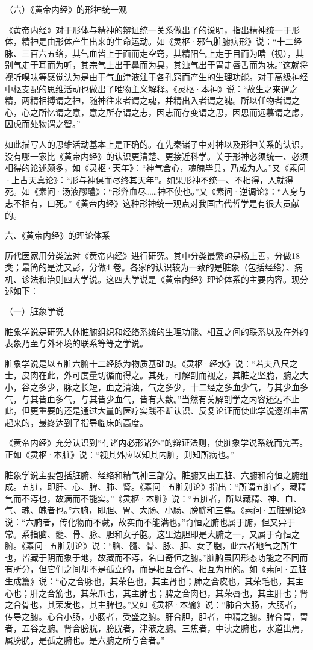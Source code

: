 \documentclass[12pt,UTF8]{ctexbook}
\begin{document}
（六）《黄帝内经》的形神统一观

《黄帝内经》对于形体与精神的辩证统一关系做出了的说明，指出精神统一于形体，精神是由形体产生出来的生命运动。如《灵枢·邪气脏腑病形》说：“十二经脉、三百六五络，其气血皆上于面而走空窍，其精阳气上走于目而为睛（视），其别气走于耳而为听，其宗气上出于鼻而为臭，其浊气出于胃走唇舌而为味。”这就将视听嗅味等感觉认为是由于气血津液注于各孔窍而产生的生理功能。对于高级神经中枢支配的思维活动也做出了唯物主义解释。《灵枢·本神》说：“故生之来谓之精，两精相搏谓之神，随神往来者谓之魂，并精出入者谓之魄。所以任物者谓之心，心之所忆谓之意，意之所存谓之志，因志而存变谓之思，因思而远慕谓之虑，因虑而处物谓之智。”

如此描写人的思维活动基本上是正确的。在先秦诸子中对神以及形神关系的认识，没有哪一家比《黄帝内经》的认识更清楚、更接近科学。关于形神必须统一、必须相得的论述颇多，如《灵枢·天年》：“神气舍心，魂魄毕具，乃成为人。”又《素问·上古天真论》：“形与神俱而尽终其天年”。如果形神不统一、不相得，人就得死。如《素问·汤液醪醴》：“形弊血尽……神不使也。”又《素问·逆调论》：“人身与志不相有，曰死。”《黄帝内经》这种形神统一观点对我国古代哲学是有很大贡献的。

六、《黄帝内经》的理论体系

历代医家用分类法对《黄帝内经》进行研究。其中分类最繁的是杨上善，分做18 类；最简的是沈又彭，分做4 卷。各家的认识较为一致的是脏象（包括经络）、病机、诊法和治则四大学说。这四大学说是《黄帝内经》理论体系的主要内容。现分述如下：

（一）脏象学说

脏象学说是研究人体脏腑组织和经络系统的生理功能、相互之间的联系以及在外的表象乃至与外环境的联系等等之学说。

脏象学说是以五脏六腑十二经脉为物质基础的。《灵枢·经水》说：“若夫八尺之士，皮肉在此，外可度量切循而得之。其死，可解剖而视之，其脏之坚脆，腑之大小，谷之多少，脉之长短，血之清浊，气之多少，十二经之多血少气，与其少血多气，与其皆血多气，与其皆少血气，皆有大数。”当然有关解剖学之内容还远不止此，但更重要的还是通过大量的医疗实践不断认识、反复论证而使此学说逐渐丰富起来的，最终达到了指导临床的高度。

《黄帝内经》充分认识到“有诸内必形诸外”的辩证法则，使脏象学说系统而完善。正如《灵枢·本脏》说：“视其外应以知其内脏，则知所病也。”

脏象学说主要包括脏腑、经络和精气神三部分。脏腑又由五脏、六腑和奇恒之腑组成。五脏，即肝、心、脾、肺、肾。《素问·五脏别论》指出：“所谓五脏者，藏精气而不泻也，故满而不能实。”《灵枢·本脏》说：“五脏者，所以藏精、神、血、气、魂、魄者也。”六腑，即胆、胃、大肠、小肠、膀胱和三焦。《素问·五脏别论》说：“六腑者，传化物而不藏，故实而不能满也。”奇恒之腑也属于腑，但又异于常。系指脑、髓、骨、脉、胆和女子胞。这里边胆即是大腑之一，又属于奇恒之腑。《素问·五脏别论》说：“脑、髓、骨、脉、胆、女子胞，此六者地气之所生也，皆藏于阴而象于地，故藏而不泻，名曰奇恒之腑。”脏腑虽因形态功能之不同而有所分，但它们之间却不是孤立的，而是相互合作、相互为用的。如《素问·五脏生成篇》说：“心之合脉也，其荣色也，其主肾也；肺之合皮也，其荣毛也，其主心也；肝之合筋也，其荣爪也，其主肺也；脾之合肉也，其荣唇也，其主肝也；肾之合骨也，其荣发也，其主脾也。”又如《灵枢·本输》说：“肺合大肠，大肠者，传导之腑。心合小肠，小肠者，受盛之腑。肝合胆，胆者，中精之腑。脾合胃，胃者，五谷之腑。肾合膀胱，膀胱者，津液之腑。三焦者，中渎之腑也，水道出焉，属膀胱，是孤之腑也。是六腑之所与合者。”
\end{document}
